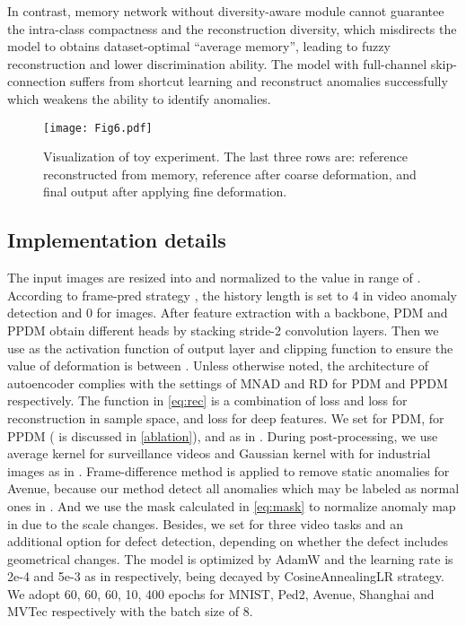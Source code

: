 \documentclass[10pt,twocolumn,letterpaper]{article}
\begin{document}
        In contrast, memory network without diversity-aware module cannot guarantee the intra-class compactness and the reconstruction diversity, which misdirects the model to obtains dataset-optimal ``average memory'', leading to fuzzy reconstruction and lower discrimination ability. The model with full-channel skip-connection suffers from shortcut learning and reconstruct anomalies successfully which weakens the ability to identify anomalies.

        \begin{figure}[t]
          \centering
          \texttt{[image: Fig6.pdf]}
          \caption{Visualization of toy experiment. The last three rows are: reference reconstructed from memory, reference after coarse deformation, and final output after applying fine deformation.}
          \vspace{-0.1em}
          \label{fig:6}
        \end{figure}

    \subsection{Implementation details}
        The input images are resized into  and normalized to the value in range of . According to frame-pred strategy \cite{framepred}, the history length is set to 4 in video anomaly detection and 0 for images. After feature extraction with a backbone, PDM and PPDM obtain different heads by stacking stride-2 convolution layers. Then we use  as the activation function of output layer and clipping function to ensure the value of deformation is between . Unless otherwise noted, the architecture of autoencoder complies with the settings of MNAD \cite{mnad} and RD \cite{rd} for PDM and PPDM respectively. The function  in \cref{eq:rec} is a combination of  loss and  loss for reconstruction in sample space, and  loss for deep features. We set  for PDM,  for PPDM ( is discussed in \cref{ablation}), and  as in \cite{vqvae}. During post-processing, we use average kernel for surveillance videos and Gaussian kernel with  for industrial images as in \cite{rd}. Frame-difference method is applied to remove static anomalies for Avenue, because our method detect all anomalies which may be labeled as normal ones in \cite{avenue}. And we use the mask calculated in \cref{eq:mask} to normalize anomaly map in \cite{timesparse} due to the scale changes. Besides, we set  for three video tasks and an additional option  for defect detection, depending on whether the defect includes geometrical changes. 
        The model is optimized by AdamW \cite{adamw} and the learning rate is 2e-4 and 5e-3 as in \cite{mnad,rd} respectively, being decayed by CosineAnnealingLR\cite{coslr} strategy. We adopt 60, 60, 60, 10, 400 epochs for MNIST, Ped2, Avenue, Shanghai and MVTec respectively with the batch size of 8. 
    
\end{document}
